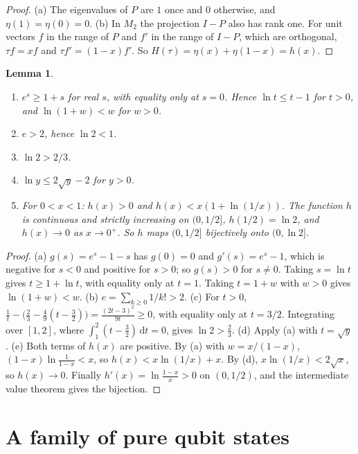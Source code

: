 \documentclass[11pt]{amsart}
\newtheorem{lemma}[theorem]{Lemma}
\theoremstyle{definition}\newtheorem{definition}[theorem]{Definition}
\theoremstyle{remark}\newtheorem{remark}[theorem]{Remark}
\newcommand{\dd}{\mathrm{d}}
\begin{document}
\begin{proof}
(a) The eigenvalues of \(P\) are \(1\) once and \(0\) otherwise, and \(\eta(1)=\eta(0)=0\). (b) In \(M_2\) the projection \(I-P\) also has rank one. For unit vectors \(f\) in the range of \(P\) and \(f'\) in the range of \(I-P\), which are orthogonal, \(\tau f=xf\) and \(\tau f'=(1-x)f'\). So \(H(\tau)=\eta(x)+\eta(1-x)=h(x)\).
\end{proof}

\begin{lemma}\label{lem:scalar}
\begin{enumerate}\renewcommand{\theenumi}{\alph{enumi}}
\item \(e^s\ge1+s\) for real \(s\), with equality only at \(s=0\). Hence \(\ln t\le t-1\) for \(t>0\), and \(\ln(1+w)<w\) for \(w>0\).
\item \(e>2\), hence \(\ln2<1\).
\item \(\ln2>2/3\).
\item \(\ln y\le2\sqrt{y}-2\) for \(y>0\).
\item For \(0<x<1\): \(h(x)>0\) and \(h(x)<x(1+\ln(1/x))\). The function \(h\) is continuous and strictly increasing on \((0,1/2]\), \(h(1/2)=\ln2\), and \(h(x)\to0\) as \(x\to0^+\). So \(h\) maps \((0,1/2]\) bijectively onto \((0,\ln2]\).
\end{enumerate}
\end{lemma}

\begin{proof}
(a) \(g(s)=e^s-1-s\) has \(g(0)=0\) and \(g'(s)=e^s-1\), which is negative for \(s<0\) and positive for \(s>0\); so \(g(s)>0\) for \(s\ne0\). Taking \(s=\ln t\) gives \(t\ge1+\ln t\), with equality only at \(t=1\). Taking \(t=1+w\) with \(w>0\) gives \(\ln(1+w)<w\).
(b) \(e=\sum_{k\ge0}1/k!>2\).
(c) For \(t>0\), \(\frac1t-\bigl(\frac23-\frac49(t-\frac32)\bigr)=\frac{(2t-3)^2}{9t}\ge0\), with equality only at \(t=3/2\). Integrating over \([1,2]\), where \(\int_1^2(t-\frac32)\,\dd t=0\), gives \(\ln2>\frac23\).
(d) Apply (a) with \(t=\sqrt y\).
(e) Both terms of \(h(x)\) are positive. By (a) with \(w=x/(1-x)\), \((1-x)\ln\frac{1}{1-x}<x\), so \(h(x)<x\ln(1/x)+x\). By (d), \(x\ln(1/x)<2\sqrt{x}\), so \(h(x)\to0\). Finally \(h'(x)=\ln\frac{1-x}{x}>0\) on \((0,1/2)\), and the intermediate value theorem gives the bijection.
\end{proof}

\section{A family of pure qubit states}\label{sec:family}
\end{document}

